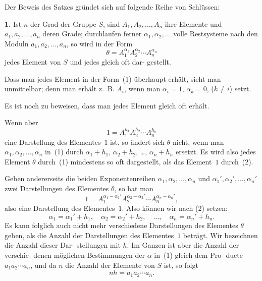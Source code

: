 \documentclass[12pt,a4paper]{article}
\theoremstyle{plain}
\theoremstyle{definition}
\theoremstyle{remark}
\begin{document}
Der Beweis des Satzes gründet sich auf folgende Reihe von
Schlüssen:

\textbf{1.} Ist $n$ der Grad der Gruppe $S$, sind $A_1, A_2, \ldots, A_n$
ihre Elemente und $a_1, a_2, \ldots, a_n$ deren Grade;
durchlaufen ferner $\alpha_1, \alpha_2, \ldots$ volle Restsysteme
nach den Moduln $a_1, a_2, \ldots, a_n$, so wird in der
Form
\begin{equation}\tag{1}
\theta = A_1^{\alpha_1} A_2^{\alpha_2} \cdots A_n^{\alpha_n}
\end{equation}
jedes Element von $S$ und jedes gleich oft dar-
gestellt.

Dass man jedes Element in der Form~(1) überhaupt erhält,
sieht man unmittelbar; denn man erhält z.~B. $A_i$, wenn man
$\alpha_i = 1$, $\alpha_k = 0$, ($k \neq i$) setzt.

Es ist noch zu beweisen, dass man jedes Element gleich
oft erhält.

Wenn aber
\begin{equation}\tag{2}
1 = A_1^{h_1} A_2^{h_2} \cdots A_n^{h_n}
\end{equation}
eine Darstellung des Elementes~$1$ ist, so ändert sich $\theta$ nicht,
wenn man $\alpha_1, \alpha_2, \ldots, \alpha_n$ in~(1) durch $\alpha_1 + h_1$, $\alpha_2 + h_2$, \ldots,
$\alpha_n + h_n$ ersetzt. Es wird also jedes Element $\theta$ durch~(1) mindestens so
oft dargestellt, als das Element~$1$ durch~(2).

Geben andererseits die beiden Exponentenreihen $\alpha_1, \alpha_2, \ldots, \alpha_n$
und $\alpha_1', \alpha_2', \ldots, \alpha_n'$ zwei Darstellungen des Elementes $\theta$, so hat man
\begin{equation}\tag{3}
1 = A_1^{\alpha_1 - \alpha_1'} A_2^{\alpha_2 - \alpha_2'} \cdots A_n^{\alpha_n - \alpha_n'},
\end{equation}
also eine Darstellung des Elementes~$1$. Also können wir nach
(2) setzen:
\[
\alpha_1 = \alpha_1' + h_1, \quad \alpha_2 = \alpha_2' + h_2, \quad \ldots, \quad \alpha_n = \alpha_n' + h_n.
\]
Es kann folglich auch nicht mehr verschiedene Darstellungen
des Elementes $\theta$ geben, als die Anzahl der Darstellungen des
Elementes~$1$ beträgt. Wir bezeichnen die Anzahl dieser Dar-
stellungen mit $h$. Im Ganzen ist aber die Anzahl der verschie-
denen möglichen Bestimmungen der $\alpha$ in~(1) gleich dem Pro-
ducte $a_1 a_2 \cdots a_n$, und da $n$ die Anzahl der Elemente von $S$ ist,
so folgt
\begin{equation}\tag{4}
nh = a_1 a_2 \cdots a_n.
\end{equation}
\end{document}
